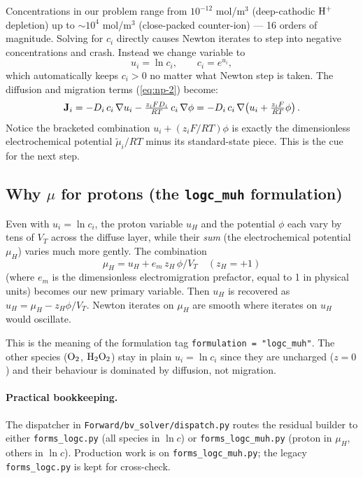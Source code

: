 \documentclass[11pt]{article}
\begin{document}
Concentrations in our problem range from $10^{-12}$ mol/m$^3$
(deep-cathodic $\mathrm{H^+}$ depletion) up to $\sim 10^{4}$ mol/m$^3$
(close-packed counter-ion) --- 16 orders of magnitude. Solving for
$c_i$ directly causes Newton iterates to step into negative
concentrations and crash. Instead we change variable to
\begin{equation}
  u_i = \ln c_i, \qquad c_i = e^{u_i},
  \label{eq:u}
\end{equation}
which automatically keeps $c_i > 0$ no matter what Newton step is
taken. The diffusion and migration terms (\ref{eq:np-2}) become:
\[
  \mathbf{J}_i = -D_i\, c_i \,\nabla u_i
                 - \tfrac{z_i F D_i}{RT}\, c_i\, \nabla\phi
               = -D_i\, c_i\, \nabla\!\left(u_i + \tfrac{z_i F}{RT}\phi\right).
\]
Notice the bracketed combination $u_i + (z_i F/RT)\phi$ is exactly
the dimensionless electrochemical potential
$\tilde\mu_i / RT$ minus its standard-state piece. This is the cue
for the next step.

\subsection{Why $\mu$ for protons (the \texttt{logc\_muh}
            formulation)}

Even with $u_i = \ln c_i$, the proton variable $u_H$ and the
potential $\phi$ each vary by tens of $V_T$ across the diffuse
layer, while their \emph{sum} (the electrochemical potential $\mu_H$)
varies much more gently. The combination
\[
  \mu_H = u_H + e_m\, z_H\, \phi/V_T \quad (z_H = +1)
\]
(where $e_m$ is the dimensionless electromigration prefactor, equal
to 1 in physical units) becomes our new primary variable. Then $u_H$
is recovered as $u_H = \mu_H - z_H \phi/V_T$. Newton iterates on
$\mu_H$ are smooth where iterates on $u_H$ would oscillate.

This is the meaning of the formulation tag \texttt{formulation =
"logc\_muh"}. The other species ($\mathrm{O_2}$, $\mathrm{H_2O_2}$) stay in
plain $u_i = \ln c_i$ since they are uncharged ($z = 0$) and their
behaviour is dominated by diffusion, not migration.

\paragraph{Practical bookkeeping.} The dispatcher in
\texttt{Forward/bv\_solver/dispatch.py} routes the residual builder
to either \texttt{forms\_logc.py} (all species in $\ln c$) or
\texttt{forms\_logc\_muh.py} (proton in $\mu_H$, others in $\ln c$).
Production work is on \texttt{forms\_logc\_muh.py}; the legacy
\texttt{forms\_logc.py} is kept for cross-check.
\end{document}
